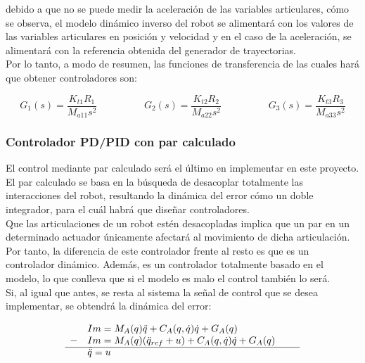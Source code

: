 debido a que no se puede medir la aceleración de las variables articulares, cómo se observa, el modelo dinámico inverso del robot se alimentará con los valores de las variables articulares en posición y velocidad y en el caso de la aceleración, se alimentará con la referencia obtenida del generador de trayectorias.\\

Por lo tanto, a modo de resumen, las funciones de transferencia de las cuales hará que obtener controladores son:

\begin{equation}
G_{1}(s)=\frac{K_{t1}R_1}{M_{a11}s^{2}} \hspace{2cm} G_{2}(s)=\frac{K_{t2}R_2}{M_{a22}s^{2}} \hspace{2cm} G_{3}(s)=\frac{K_{t3}R_3}{M_{a33}s^{2}}
\end{equation}

\newpage
\subsubsection{Controlador PD/PID con par calculado}

El control mediante par calculado será el último en implementar en este proyecto. El par calculado se basa en la búsqueda de desacoplar totalmente las interacciones del robot, resultando la dinámica del error cómo un doble integrador, para el cuál habrá que diseñar controladores. \\
Que las articulaciones de un robot estén desacopladas implica que un par en un determinado actuador únicamente afectará al movimiento de dicha articulación.\\

Por tanto, la diferencia de este controlador frente al resto es que es un controlador dinámico. Además, es un controlador totalmente basado en el modelo, lo que conlleva que si el modelo es malo el control también lo será.\\

Si, al igual que antes, se resta al sistema la señal de control que se desea implementar, se obtendrá la dinámica del error:

\begin{equation}
\begin{array}{llll}
& Im=M_{A}(q)\ddot{q} + C_{A}(q,\dot{q})\dot{q} + G_{A}(q) \\

- & Im=M_{A}(q)(\ddot{q}_{ref}+u) + C_{A}(q,\dot{q})\dot{q} + G_{A}(q) \\

\cline{1-4}

\vspace{0.2cm}

& \tilde{\ddot{q}} = u & &
\end{array}
\end{equation}



